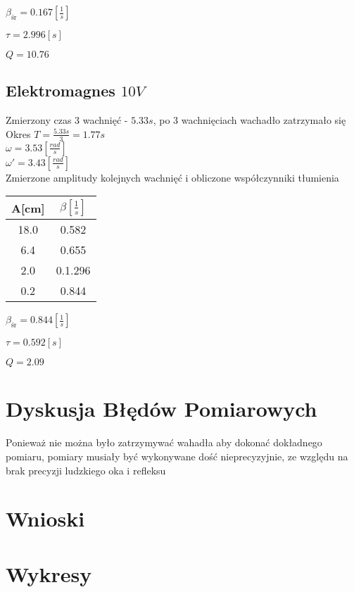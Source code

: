\documentclass[]{article}
\begin{document}
	$\beta_{\text{śr}} = 0.167 \left[ \frac{1}{s}\right] $
	
	$\tau=2.996[s]$
	
	$Q = 10.76$
	
	\subsection{Elektromagnes $10V$}
	Zmierzony czas 3 wachnięć - $5.33s$, po 3 wachnięciach wachadło zatrzymało się\\
	Okres $T=\frac{5.33s}{3} = 1.77s$\\
	$\omega = 3.53 \left[ \frac{rad}{s}\right]$\\
	$\omega' = 3.43 \left[ \frac{rad}{s}\right]$\\
	Zmierzone amplitudy kolejnych wachnięć i obliczone współczynniki tłumienia
	\begin{table}[h]
		\begin{tabular}{|c|c|}
			\hline 
			A[cm] & $\beta\left[ \frac{1}{s}\right] $ \\ 
			\hline 
			18.0 & 0.582 \\ 
			\hline 
			6.4 & 0.655 \\ 
			\hline 
			2.0 & 0.1.296 \\ 
			\hline 
			0.2 & 0.844 \\ 
			\hline 
		\end{tabular} 
	\end{table}
	
	$\beta_{\text{śr}} = 0.844 \left[ \frac{1}{s}\right] $
	
	$\tau=0.592[s]$
	
	$Q = 2.09$
	\section{Dyskusja Błędów Pomiarowych}
	Ponieważ nie można było zatrzymywać wahadła aby dokonać dokładnego pomiaru, pomiary musiały być wykonywane dość nieprecyzyjnie, ze względu na brak precyzji ludzkiego oka i refleksu
	\section{Wnioski}
	\section{Wykresy}
\end{document}
